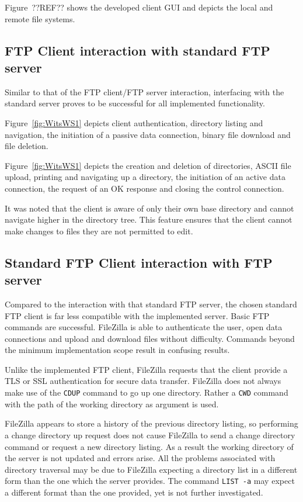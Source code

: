 \documentclass[10pt,twocolumn]{witseiepaper}
\begin{document}
Figure~??REF?? shows the developed client GUI and depicts the local and remote file systems. 

\subsection{FTP Client interaction with standard FTP server}

Similar to that of the FTP client/FTP server interaction, interfacing with the standard server proves to be successful for all implemented functionality. 

Figure~\ref{fig:WitsWS1} depicts client authentication, directory listing and navigation, the initiation of a passive data connection, binary file download and file deletion. 

Figure~\ref{fig:WitsWS1} depicts the creation and deletion of directories, ASCII file upload, printing and navigating up a directory, the initiation of an active data connection, the request of an OK response and closing the control connection.

It was noted that the client is aware of only their own base directory and cannot navigate higher in the directory tree. This feature ensures that the client cannot make changes to files they are not permitted to edit.

\subsection{Standard FTP Client interaction with FTP server}

Compared to the interaction with that standard FTP server, the chosen standard FTP client is far less compatible with the implemented server. Basic FTP commands are successful. FileZilla is able to authenticate the user, open data connections and upload and download files without difficulty. Commands beyond the minimum implementation scope result in confusing results.

Unlike the implemented FTP client, FileZilla requests that the client provide a TLS or SSL authentication for secure data transfer. FileZilla does not always make use of the \texttt{CDUP} command to go up one directory. Rather a \texttt{CWD} command with the path of the working directory as argument is used. 

FileZilla appears to store a history of the previous directory listing, so performing a change directory up request does not cause FileZilla to send a change directory command or request a new directory listing. As a result the working directory of the server is not updated and errors arise. All the problems associated with directory traversal may be due to FileZilla expecting a directory list in a different form than the one which the server provides. The command \texttt{LIST~-a} may expect a different format than the one provided, yet is not further investigated.
\end{document}
